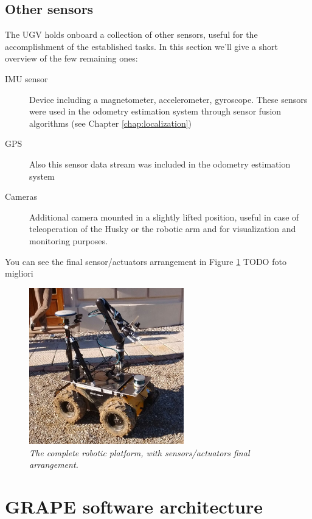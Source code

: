 \subsection{Other sensors}
The \ac{UGV} holds onboard a collection of other sensors, useful for the accomplishment of the established tasks. In this section we'll give a short overview of the few remaining ones:
\begin{description}
	\item[{IMU} sensor] Device including a magnetometer, accelerometer, gyroscope. These sensors were used in the odometry estimation system through sensor fusion algorithms (see Chapter \ref{chap:localization})
	\item[GPS] Also this sensor data stream was included in the odometry estimation system
	\item [Cameras] Additional camera mounted in a slightly lifted position, useful in case of teleoperation of the Husky or the robotic arm and for visualization and monitoring purposes.
\end{description}

You can see the final sensor/actuators arrangement in Figure \ref{fig:disposizioneFinale} TODO foto migliori
\begin{figure}
	\centering
	\includegraphics[width=0.6\textwidth]{Images/grape_sw_hw_architecture/disposizioneFinale.jpeg}
	\caption{\textit{The complete robotic platform, with sensors/actuators final arrangement.}}
	\label{fig:disposizioneFinale}
\end{figure}
 
\section{GRAPE software architecture}\label{sec:grapeSwArch}

